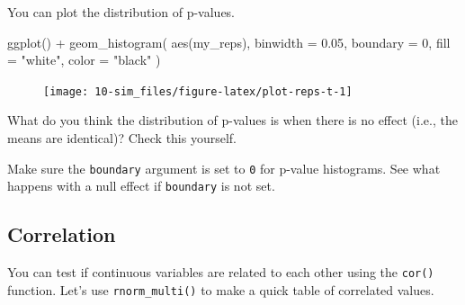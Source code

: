 \documentclass[
  oneside]{book}
\newenvironment{Shaded}{\begin{snugshade}}{\end{snugshade}}
\newcommand{\AttributeTok}[1]{\textcolor[rgb]{0.77,0.63,0.00}{#1}}
\newcommand{\DecValTok}[1]{\textcolor[rgb]{0.00,0.00,0.81}{#1}}
\newcommand{\FloatTok}[1]{\textcolor[rgb]{0.00,0.00,0.81}{#1}}
\newcommand{\FunctionTok}[1]{\textcolor[rgb]{0.00,0.00,0.00}{#1}}
\newcommand{\NormalTok}[1]{#1}
\newcommand{\OtherTok}[1]{\textcolor[rgb]{0.56,0.35,0.01}{#1}}
\newcommand{\SpecialCharTok}[1]{\textcolor[rgb]{0.00,0.00,0.00}{#1}}
\newcommand{\StringTok}[1]{\textcolor[rgb]{0.31,0.60,0.02}{#1}}
\begin{document}
You can plot the distribution of p-values.

\begin{Shaded}
\begin{Highlighting}[]
\FunctionTok{ggplot}\NormalTok{() }\SpecialCharTok{+} 
  \FunctionTok{geom\_histogram}\NormalTok{(}
    \FunctionTok{aes}\NormalTok{(my\_reps), }
    \AttributeTok{binwidth =} \FloatTok{0.05}\NormalTok{, }
    \AttributeTok{boundary =} \DecValTok{0}\NormalTok{,}
    \AttributeTok{fill =} \StringTok{"white"}\NormalTok{, }
    \AttributeTok{color =} \StringTok{"black"}
\NormalTok{  )}
\end{Highlighting}
\end{Shaded}

\begin{figure}

{\centering \texttt{[image: 10-sim\_files/figure-latex/plot-reps-t-1]} 

}

\end{figure}

\begin{try}
What do you think the distribution of p-values is
when there is no effect (i.e., the means are identical)? Check this yourself.

\end{try}

\begin{warning}
Make sure the \texttt{boundary} argument is set to \texttt{0} for p-value histograms. See what happens with a null effect if \texttt{boundary} is not set.

\end{warning}

\hypertarget{correlation}{%
\subsection{Correlation}\label{correlation}}

You can test if continuous variables are related to each other using the \texttt{cor()} function. Let's use \texttt{rnorm\_multi()} to make a quick table of correlated values.

\begin{Shaded}
\end{Shaded}
\end{document}
